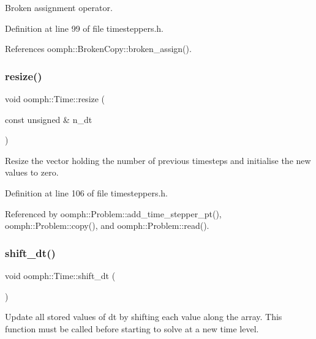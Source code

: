 Broken assignment operator. 



Definition at line 99 of file timesteppers.\+h.



References oomph\+::\+Broken\+Copy\+::broken\+\_\+assign().

\mbox{\label{classoomph_1_1Time_aeab1acb1e182797c4194af84c0583c3f}} 
\subsubsection{\texorpdfstring{resize()}{resize()}}
{\footnotesize\ttfamily void oomph\+::\+Time\+::resize (\begin{DoxyParamCaption}\item[{const unsigned \&}]{n\+\_\+dt }\end{DoxyParamCaption})\hspace{0.3cm}{\ttfamily [inline]}}



Resize the vector holding the number of previous timesteps and initialise the new values to zero. 



Definition at line 106 of file timesteppers.\+h.



Referenced by oomph\+::\+Problem\+::add\+\_\+time\+\_\+stepper\+\_\+pt(), oomph\+::\+Problem\+::copy(), and oomph\+::\+Problem\+::read().

\mbox{\label{classoomph_1_1Time_a92ca0ca34a1491744a3315d61d7cee5f}} 
\subsubsection{\texorpdfstring{shift\+\_\+dt()}{shift\_dt()}}
{\footnotesize\ttfamily void oomph\+::\+Time\+::shift\+\_\+dt (\begin{DoxyParamCaption}{ }\end{DoxyParamCaption})\hspace{0.3cm}{\ttfamily [inline]}}



Update all stored values of dt by shifting each value along the array. This function must be called before starting to solve at a new time level. 



